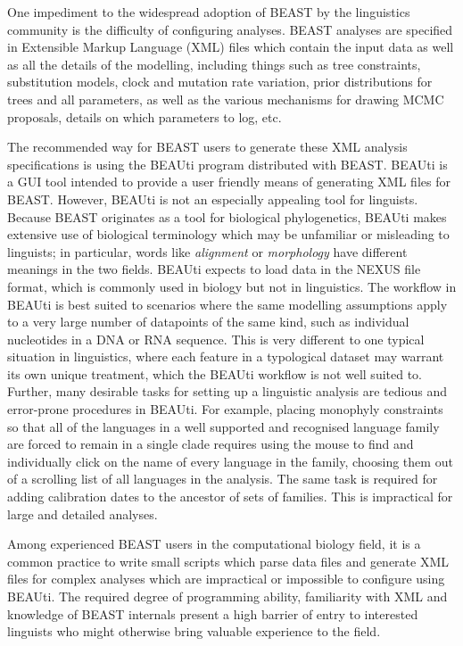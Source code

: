 \documentclass[twocolumn,10pt]{scrartcl}
\begin{document}
One impediment to the widespread adoption of BEAST by the linguistics community is the difficulty of configuring analyses.  BEAST analyses are specified in Extensible Markup Language (XML) files which contain the input data as well as all the details of the modelling, including things such as tree constraints, substitution models, clock and mutation rate variation, prior distributions for trees and all parameters, as well as the various mechanisms for drawing MCMC proposals, details on which parameters to log, etc.

The recommended way for BEAST users to generate these XML analysis specifications is using the BEAUti program distributed with BEAST.  BEAUti is a GUI tool intended to provide a user friendly means of generating XML files for BEAST.  However, BEAUti is not an especially appealing tool for linguists.  Because BEAST originates as a tool for biological phylogenetics, BEAUti makes extensive use of biological terminology which may be unfamiliar or misleading to linguists; in particular, words like \emph{alignment} or \emph{morphology} have different meanings in the two fields.  BEAUti expects to load data in the NEXUS file format\cite{Maddison1997}, which is commonly used in biology but not in linguistics.  The workflow in BEAUti is best suited to scenarios where the same modelling assumptions apply to a very large number of datapoints of the same kind, such as individual nucleotides in a DNA or RNA sequence.  This is very different to one typical situation in linguistics, where each feature in a typological dataset may warrant its own unique treatment, which the BEAUti workflow is not well suited to.  Further, many desirable tasks for setting up a linguistic analysis are tedious and error-prone procedures in BEAUti.  For example, placing monophyly constraints so that all of the languages in a well supported and recognised language family are forced to remain in a single clade requires using the mouse to find and individually click on the name of every language in the family, choosing them out of a scrolling list of all languages in the analysis.  The same task is required for adding calibration dates to the ancestor of sets of families.  This is impractical for large and detailed analyses.

Among experienced BEAST users in the computational biology field, it is a common practice to write small scripts which parse data files and generate XML files for complex analyses which are impractical or impossible to configure using BEAUti.  The required degree of programming ability, familiarity with XML and knowledge of BEAST internals present a high barrier of entry to interested linguists who might otherwise bring valuable experience to the field.
\end{document}
